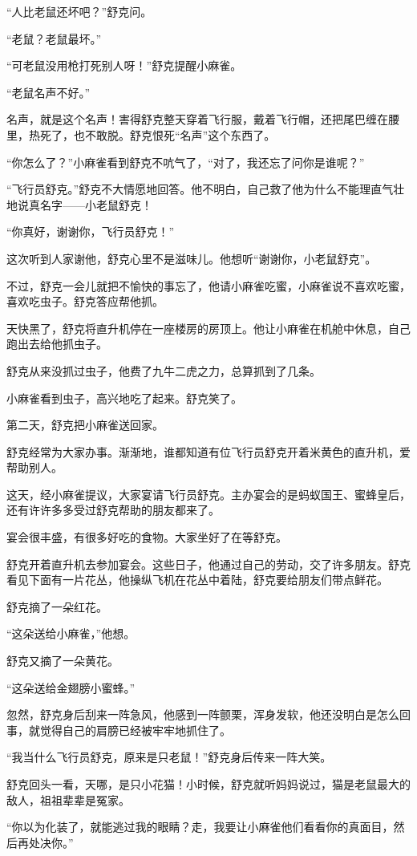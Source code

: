 \documentclass[a4paper,12pt,UTF8,twoside]{ctexbook}
\begin{document}
“人比老鼠还坏吧？”舒克问。

“老鼠？老鼠最坏。”

“可老鼠没用枪打死别人呀！”舒克提醒小麻雀。

“老鼠名声不好。”

名声，就是这个名声！害得舒克整天穿着飞行服，戴着飞行帽，还把尾巴缠在腰里，热死了，也不敢脱。舒克恨死“名声”这个东西了。

“你怎么了？”小麻雀看到舒克不吭气了，“对了，我还忘了问你是谁呢？”

“飞行员舒克。”舒克不大情愿地回答。他不明白，自己救了他为什么不能理直气壮地说真名字——小老鼠舒克！

“你真好，谢谢你，飞行员舒克！”

这次听到人家谢他，舒克心里不是滋味儿。他想听“谢谢你，小老鼠舒克”。

不过，舒克一会儿就把不愉快的事忘了，他请小麻雀吃蜜，小麻雀说不喜欢吃蜜，喜欢吃虫子。舒克答应帮他抓。

天快黑了，舒克将直升机停在一座楼房的房顶上。他让小麻雀在机舱中休息，自己跑出去给他抓虫子。

舒克从来没抓过虫子，他费了九牛二虎之力，总算抓到了几条。

小麻雀看到虫子，高兴地吃了起来。舒克笑了。

第二天，舒克把小麻雀送回家。

舒克经常为大家办事。渐渐地，谁都知道有位飞行员舒克开着米黄色的直升机，爱帮助别人。

这天，经小麻雀提议，大家宴请飞行员舒克。主办宴会的是蚂蚁国王、蜜蜂皇后，还有许许多多受过舒克帮助的朋友都来了。

宴会很丰盛，有很多好吃的食物。大家坐好了在等舒克。

舒克开着直升机去参加宴会。这些日子，他通过自己的劳动，交了许多朋友。舒克看见下面有一片花丛，他操纵飞机在花丛中着陆，舒克要给朋友们带点鲜花。

舒克摘了一朵红花。

“这朵送给小麻雀，”他想。

舒克又摘了一朵黄花。

“这朵送给金翅膀小蜜蜂。”

忽然，舒克身后刮来一阵急风，他感到一阵颤栗，浑身发软，他还没明白是怎么回事，就觉得自己的肩膀已经被牢牢地抓住了。

“我当什么飞行员舒克，原来是只老鼠！”舒克身后传来一阵大笑。

舒克回头一看，天哪，是只小花猫！小时候，舒克就听妈妈说过，猫是老鼠最大的敌人，祖祖辈辈是冤家。

“你以为化装了，就能逃过我的眼睛？走，我要让小麻雀他们看看你的真面目，然后再处决你。”
\end{document}
